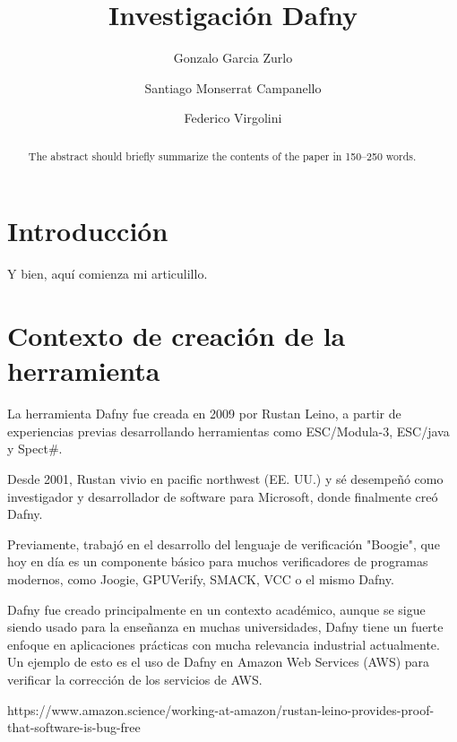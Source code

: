 \documentclass[runningheads]{llncs}
\begin{document}
%
\title{Investigación Dafny}
%
\author{Gonzalo Garcia Zurlo \and
Santiago Monserrat Campanello \and
Federico Virgolini}
%
%
%
\maketitle
\begin{abstract}
    The abstract should briefly summarize the contents of the paper in
    150--250 words.
\end{abstract}
%
\tableofcontents
\section{Introducción}
Y bien, aquí comienza mi articulillo.
\section{Contexto de creación de la herramienta}

La herramienta Dafny fue creada en 2009 por Rustan Leino,
a partir de experiencias previas desarrollando herramientas como ESC/Modula-3, ESC/java y Spect\#.

Desde 2001, Rustan vivio en pacific northwest (EE. UU.) y sé desempeñó como investigador y desarrollador de software para Microsoft,
donde finalmente creó Dafny.

Previamente, trabajó en el desarrollo del lenguaje de verificación "Boogie",
que hoy en día es un componente básico para muchos verificadores de programas modernos,
como Joogie, GPUVerify, SMACK, VCC o el mismo Dafny.    

Dafny fue creado principalmente en un contexto académico, 
aunque se sigue siendo usado para la enseñanza en muchas universidades, 
Dafny tiene un fuerte enfoque en aplicaciones prácticas con mucha relevancia industrial actualmente.
Un ejemplo de esto es el uso de Dafny en Amazon Web Services (AWS) para verificar la corrección de los servicios de AWS.

https://www.amazon.science/working-at-amazon/rustan-leino-provides-proof-that-software-is-bug-free
\end{document}
